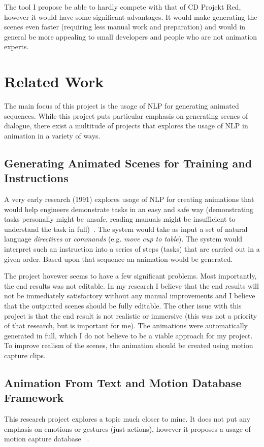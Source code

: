 The tool I propose be able to hardly compete with that of CD Projekt Red, however it would have some significant advantages. It would make generating the scenes even faster (requiring less manual work and preparation) and would in general be more appealing to small developers and people who are not animation experts.

\section{Related Work}
The main focus of this project is the usage of NLP for generating animated sequences. While this project puts particular emphasis on generating scenes of dialogue, there exist a multitude of projects that explores the usage of NLP in animation in a variety of ways.

\subsection{Generating Animated Scenes for Training and Instructions}
A very early research (1991) explores usage of NLP for creating animations that would help engineers demonstrate tasks in an easy and safe way (demonstrating tasks personally might be unsafe, reading manuals might be insufficient to understand the task in full)~\cite{animosha}. The system would take as input a set of natural language \textit{directives} or \textit{commands} (e.g. \textit{move cup to table}). The system would interpret such an instruction into a series of steps (tasks) that are carried out in a given order. Based upon that sequence an animation would be generated.

The project hovewer seems to have a few significant problems. Most importantly, the end results was not editable. In my research I believe that the end results will not be immediately satisfactory without any manual improvements and I believe that the outputted scenes should be fully editable. The other issue with this project is that the end result is not realistic or immersive (this was not a priority of that research, but is important for me). The animations were automatically generated in full, which I do not believe to be a viable approach for my project. To improve realism of the scenes, the animation should be created using motion capture clips.

\subsection{Animation From Text and Motion Database Framework}
This research project explores a topic much closer to mine. It does not put any emphasis on emotions or gestures (just actions), however it proposes a usage of motion capture database ~\cite{animmc}.


